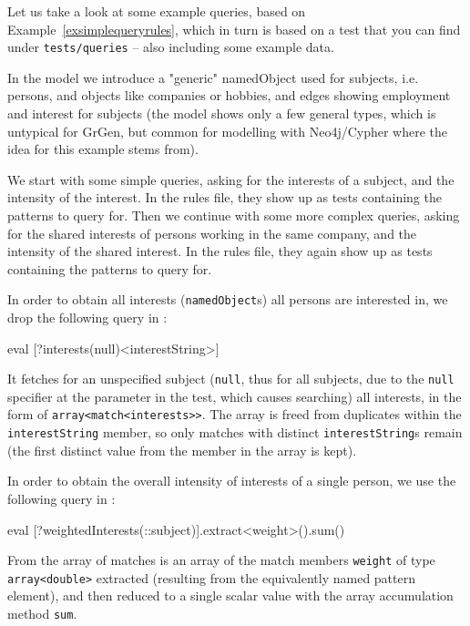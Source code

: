 \begin{example}\label{exsimplequery}

Let us take a look at some example queries, based on Example~\ref{exsimplequeryrules}, which in turn is based on a test that you can find under \texttt{tests/queries} -- also including some example data.

In the model we introduce a "generic" namedObject used for subjects, i.e. persons, and objects like companies or hobbies, and edges showing employment and interest for subjects (the model shows only a few general types, which is untypical for GrGen, but common for modelling with Neo4j/Cypher where the idea for this example stems from).

We start with some simple queries, asking for the interests of a subject, and the intensity of the interest.
In the rules file, they show up as tests containing the patterns to query for.
Then we continue with some more complex queries, asking for the shared interests of persons working in the same company, and the intensity of the shared interest.
In the rules file, they again show up as tests containing the patterns to query for.

\vspace{3mm}

In order to obtain all interests (\texttt{namedObject}s) all persons are interested in, we drop the following query in \GrShell:

	\begin{grshell}
eval [?interests(null)\keepOneForEach<interestString>]
  \end{grshell}

It fetches for an unspecified subject (\texttt{null}, thus for all subjects, due to the \texttt{null} specifier at the parameter in the test, which causes searching) all interests, in the form of \texttt{array<match<interests>>}. The array is freed from duplicates within the \texttt{interestString} member, so only matches with distinct \texttt{interestString}s remain (the first distinct value from the member in the array is kept).

In order to obtain the overall intensity of interests of a single person, we use the following query in \GrShell:

	\begin{grshell}
eval [?weightedInterests(::subject)].extract<weight>().sum()
  \end{grshell}

From the array of matches is an array of the match members \texttt{weight} of type \texttt{array<double>} extracted (resulting from the equivalently named pattern element), and then reduced to a single scalar value with the array accumulation method \texttt{sum}.


\end{example}
